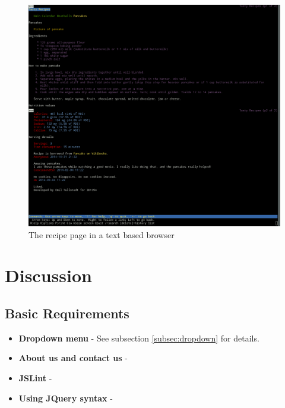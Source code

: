 \documentclass[a4paper]{scrartcl}
\begin{document}
\begin{figure}[!h]
  \begin{center}
    \includegraphics[scale=0.3]{pancakelynxboth.png}
    \caption{The recipe page in a text based browser}
    \label{fig:pancakelynx}
  \end{center}
\end{figure}
\section{Discussion}

\subsection{Basic Requirements}
\begin{itemize}
\item \textbf{Dropdown menu} - See subsection \ref{subsec:dropdown} for details.
\item \textbf{About us and contact us} -
\item \textbf{JSLint} -
\item \textbf{Using JQuery syntax} - 
\end{itemize}
\end{document}
